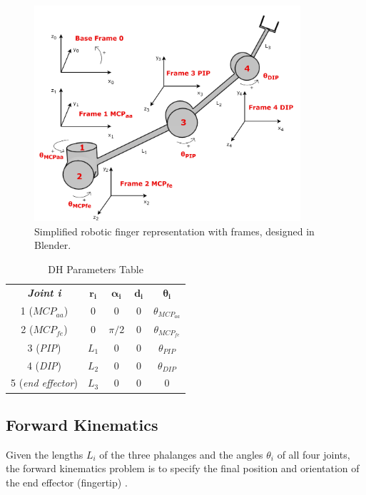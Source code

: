 \documentclass[a4paper,12pt]{article}
\begin{document}
\begin{figure}[htbp]
    \centering
    \includegraphics[width=0.88\textwidth]{img/blender_axes2.png}
    \caption{Simplified robotic finger representation with frames, designed in Blender.}
    \label{fig:blender_axes}
\end{figure}

\renewcommand{\arraystretch}{1.5} %
\begin{table}[h]
\centering
\caption{DH Parameters Table}
\label{tab:dh_parameters}
\vspace{1pt}
\begin{tabular}{|c|c|c|c|c|}
\hline
\textit{\textbf{Joint i}} & $\boldsymbol{r_{i}}$ & $\boldsymbol{\alpha_{i}}$ & $\boldsymbol{d_i}$ & $\boldsymbol{\theta_i}$ \\ \hhline{|=|=|=|=|=|}
1 (\textit{$MCP_{aa}$}) & 0 & 0 & 0 & $\theta_{MCP_{aa}}$ \\ \hline
2 (\textit{$MCP_{fe}$}) & 0 & $\pi/2$ & 0 & $\theta_{MCP_{fe}}$ \\ \hline
3 (\textit{PIP}) & $L_1$ & 0 & 0 & $\theta_{PIP}$ \\ \hline
4 (\textit{DIP}) & $L_2$ & 0 & 0 & $\theta_{DIP}$ \\ \hline
5 (\textit{end effector}) & $L_3$ & 0 & 0 & 0 \\ \hline
\end{tabular}
\end{table}


\subsection{Forward Kinematics}
Given the lengths $L_{i}$ of the three phalanges and the angles $\theta_{i}$ of all four joints, the forward kinematics problem is to specify the final position and orientation of the end effector (fingertip) \cite{borghesan2010design, CheckValidAngles_BEST_chen2013constraint, BEST_li2022kinematic, chen2014human, tsakonas2024parameter, ueda2024development}.
\end{document}

